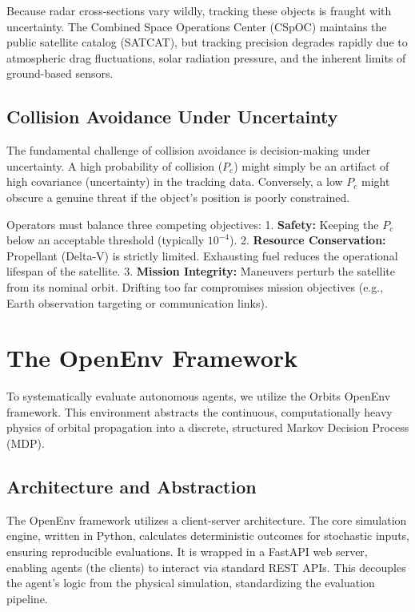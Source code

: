 \documentclass[10pt,journal,compsoc]{IEEEtran}
\begin{document}
Because radar cross-sections vary wildly, tracking these objects is fraught with uncertainty. The Combined Space Operations Center (CSpOC) maintains the public satellite catalog (SATCAT), but tracking precision degrades rapidly due to atmospheric drag fluctuations, solar radiation pressure, and the inherent limits of ground-based sensors.

\subsection{Collision Avoidance Under Uncertainty}
The fundamental challenge of collision avoidance is decision-making under uncertainty. A high probability of collision ($P_c$) might simply be an artifact of high covariance (uncertainty) in the tracking data. Conversely, a low $P_c$ might obscure a genuine threat if the object's position is poorly constrained.

Operators must balance three competing objectives:
1. \textbf{Safety:} Keeping the $P_c$ below an acceptable threshold (typically $10^{-4}$).
2. \textbf{Resource Conservation:} Propellant (Delta-V) is strictly limited. Exhausting fuel reduces the operational lifespan of the satellite.
3. \textbf{Mission Integrity:} Maneuvers perturb the satellite from its nominal orbit. Drifting too far compromises mission objectives (e.g., Earth observation targeting or communication links).

\section{The OpenEnv Framework}

To systematically evaluate autonomous agents, we utilize the Orbits OpenEnv framework. This environment abstracts the continuous, computationally heavy physics of orbital propagation into a discrete, structured Markov Decision Process (MDP).

\subsection{Architecture and Abstraction}
The OpenEnv framework utilizes a client-server architecture. The core simulation engine, written in Python, calculates deterministic outcomes for stochastic inputs, ensuring reproducible evaluations. It is wrapped in a FastAPI web server, enabling agents (the clients) to interact via standard REST APIs. This decouples the agent's logic from the physical simulation, standardizing the evaluation pipeline.
\end{document}
